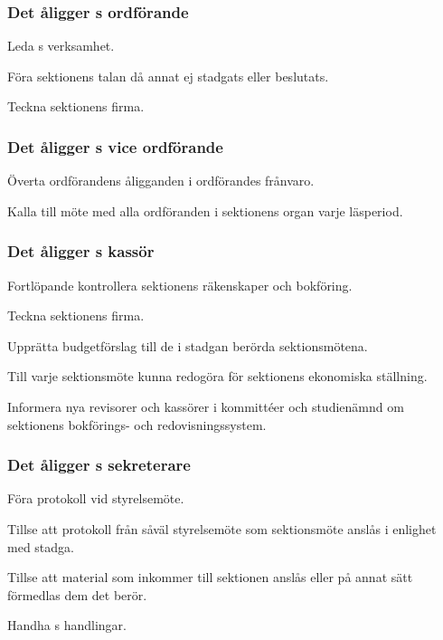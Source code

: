 \subsubsection{Det åligger \STYRIT{}s ordförande}
\begin{att}
	\item Leda \STYRIT{}s verksamhet.
	\item Föra sektionens talan då annat ej stadgats eller beslutats.
	\item Teckna sektionens firma.
\end{att}

\subsubsection{Det åligger \STYRIT{}s vice ordförande}
\begin{att}
	\item Överta ordförandens åligganden i ordförandes frånvaro.
	\item Kalla till möte med alla ordföranden i sektionens organ varje läsperiod.
\end{att}

\subsubsection{Det åligger \STYRIT{}s kassör}
\begin{att}
	\item Fortlöpande kontrollera sektionens räkenskaper och bokföring.
	\item Teckna sektionens firma.
	\item Upprätta budgetförslag till de i stadgan berörda sektionsmötena.
	\item Till varje sektionsmöte kunna redogöra för sektionens ekonomiska ställning.
	\item Informera nya revisorer och kassörer i kommittéer och studienämnd om sektionens bokförings- och redovisningssystem.
\end{att}
 
\subsubsection{Det åligger \STYRIT{}s sekreterare}
\begin{att}
	\item Föra protokoll vid styrelsemöte.
	\item Tillse att protokoll från såväl styrelsemöte som sektionsmöte anslås i enlighet med stadga.
	\item Tillse att material som inkommer till sektionen anslås eller på annat sätt förmedlas dem det berör.
	\item Handha \STYRIT{}s handlingar.
\end{att}

